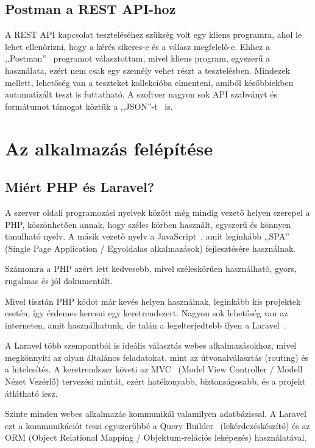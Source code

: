 \documentclass[
]{thesis-ekf}
\theoremstyle{definition}
\theoremstyle{remark}
\begin{document}
	\section{Postman a REST API-hoz}
	A REST API kapcsolat teszteléséhez szükség volt egy kliens programra, ahol le lehet ellenőrizni, hogy a kérés sikeres-e és a válasz megfelelő-e. Ehhez a ,,Postman''~\cite{postman_doc} programot választottam, mivel kliens program, egyszerű a használata, ezért nem csak egy személy vehet részt a tesztelésben. Mindezek mellett, lehetőség van a teszteket kollekcióba elmenteni, amiből későbbiekben automatizált teszt is futtatható. A szoftver nagyon sok API szabványt és formátumot támogat köztük a ,,JSON''-t~\cite{json_doc} is.
	
	\chapter{Az alkalmazás felépítése}
	\section{Miért PHP és Laravel?}
	A szerver oldali programozási nyelvek között még mindig vezető helyen szerepel a PHP, köszönhetően annak, hogy széles körben használt, egyszerű és könnyen tanulható nyelv. A másik vezető nyelv a JavaScript~\cite{js_book}, amit leginkább ,,SPA'' (Single Page Application / Egyoldalas alkalmazások) fejlesztésére használnak. 
	
	Számomra a PHP azért lett kedvesebb, mivel széleskörűen használható, gyors, rugalmas és jól dokumentált. 
	
	Mivel tisztán PHP kódot már kevés helyen használnak, leginkább kis projektek esetén, így érdemes keresni egy keretrendszert. Nagyon sok lehetőség van az interneten, amit használhatunk, de talán a legelterjedtebb ilyen a Laravel~\cite{laravel_book}. 
	
	A Laravel több szempontból is ideális választás webes alkalmazásokhoz, mivel megkönnyíti az olyan általános feladatokat, mint az útvonalválasztás (routing) és a hitelesítés. A keretrendszer követi az MVC~\cite{mvc_pattern} (Model View Controller / Modell Nézet Vezérlő) tervezési mintát, ezért hatékonyabb, biztonságosabb, és a projekt átlátható lesz. 
	
	Szinte minden webes alkalmazás kommunikál valamilyen adatbázissal. A Laravel ezt a kommunikációt teszi egyszerűbbé a Query Builder~\cite{laravel_querybuilder} (lekérdezéskészítő) és az ORM (Object Relational Mapping / Objektum-relációs leképezés) használatával. 
	
\end{document}
